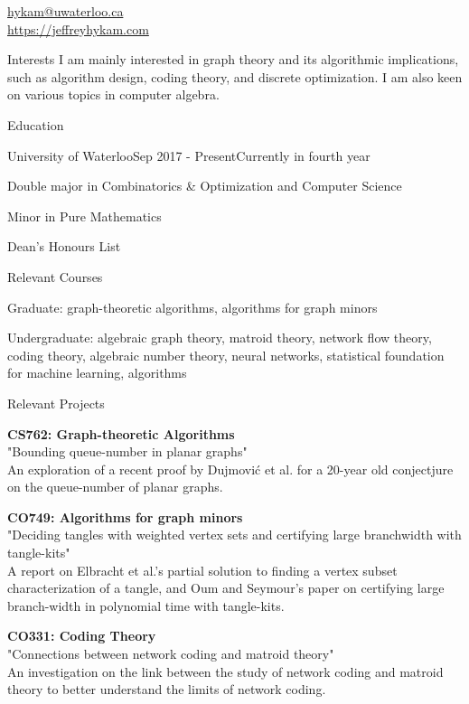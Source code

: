 \documentclass{cv}
\begin{document}

\href{hykam@uwaterloo.ca}{hykam@uwaterloo.ca} \\
\href{https://jeffreyhykam.com}{https://jeffreyhykam.com}

\begin{rSection}{Interests}
	I am mainly interested in graph theory and its algorithmic implications, such as algorithm design, coding theory, and discrete optimization. 
	I am also keen on various topics in computer algebra.
\end{rSection}

\begin{rSection}{Education}
\begin{rSubsection}{University of Waterloo}{Sep 2017 - Present}{Currently in fourth year}{}
	\item Double major in Combinatorics \& Optimization and Computer Science
	\item Minor in Pure Mathematics
	\item Dean's Honours List
\end{rSubsection}

\begin{rSubsection}{Relevant Courses}{}{}{}
	\item Graduate: graph-theoretic algorithms, algorithms for graph minors
	\item Undergraduate: algebraic graph theory, matroid theory, network flow theory, coding theory, algebraic number theory, neural networks, statistical foundation for machine learning, algorithms
\end{rSubsection}

\begin{rSubsection}{Relevant Projects}{}{}{}
	\item \textbf{CS762: Graph-theoretic Algorithms} \\
	"Bounding queue-number in planar graphs" \\
	An exploration of a recent proof by Dujmovi\'{c} et al. for a 20-year old conjectjure on the queue-number of planar graphs.
	\item \textbf{CO749: Algorithms for graph minors} \\
	"Deciding tangles with weighted vertex sets and certifying large branchwidth with tangle-kits" \\
	A report on Elbracht et al.'s partial solution to finding a vertex subset characterization of a tangle, 
	and Oum and Seymour's paper on certifying large branch-width in polynomial time with tangle-kits.
	\item \textbf{CO331: Coding Theory} \\
	"Connections between network coding and matroid theory" \\
	An investigation on the link between the study of network coding and matroid theory 
	to better understand the limits of network coding.
\end{rSubsection}
\end{rSection}
\end{document}
